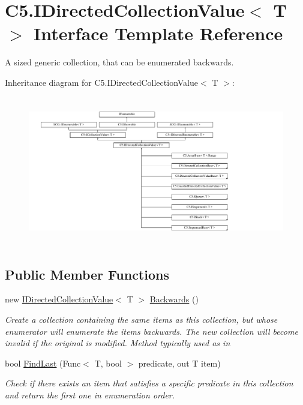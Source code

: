 \hypertarget{interface_c5_1_1_i_directed_collection_value}{}\section{C5.\+I\+Directed\+Collection\+Value$<$ T $>$ Interface Template Reference}
\label{interface_c5_1_1_i_directed_collection_value}


A sized generic collection, that can be enumerated backwards.  


Inheritance diagram for C5.\+I\+Directed\+Collection\+Value$<$ T $>$\+:\begin{figure}[H]
\begin{center}
\leavevmode
\includegraphics[height=6.536964cm]{interface_c5_1_1_i_directed_collection_value}
\end{center}
\end{figure}
\subsection*{Public Member Functions}
\begin{DoxyCompactItemize}
\item 
new \hyperlink{interface_c5_1_1_i_directed_collection_value}{I\+Directed\+Collection\+Value}$<$ T $>$ \hyperlink{interface_c5_1_1_i_directed_collection_value_ae5665ed396ea2801266c4b2bfb3dae41}{Backwards} ()
\begin{DoxyCompactList}\small\item\em Create a collection containing the same items as this collection, but whose enumerator will enumerate the items backwards. The new collection will become invalid if the original is modified. Method typically used as in \end{DoxyCompactList}\item 
bool \hyperlink{interface_c5_1_1_i_directed_collection_value_a93725b1f694e0d1cf5827e481ea467b7}{Find\+Last} (Func$<$ T, bool $>$ predicate, out T item)
\begin{DoxyCompactList}\small\item\em Check if there exists an item that satisfies a specific predicate in this collection and return the first one in enumeration order. \end{DoxyCompactList}\end{DoxyCompactItemize}
